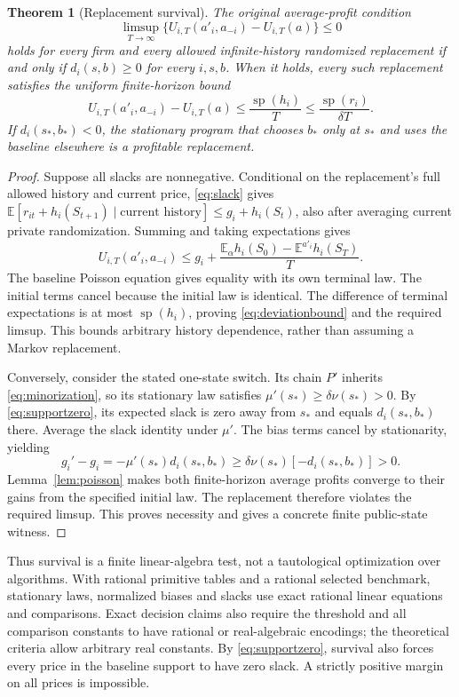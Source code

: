 \documentclass[11pt,a4paper]{article}
\newtheorem{theorem}{Theorem}
\newcommand{\E}{\mathbb E}
\newcommand{\spn}{\operatorname{sp}}
\begin{document}
\begin{theorem}[Replacement survival]\label{thm:replacement}
The original average-profit condition
\[
 \limsup_{T\to\infty}
 \{U_{i,T}(a'_i,a_{-i})-U_{i,T}(a)\}\leq0
\]
holds for every firm and every allowed infinite-history randomized replacement
if and only if $d_i(s,b)\geq0$ for every $i,s,b$.
When it holds, every such replacement satisfies the uniform finite-horizon bound
\begin{equation}\label{eq:deviationbound}
 U_{i,T}(a'_i,a_{-i})-U_{i,T}(a)
 \leq\frac{\spn(h_i)}T\leq\frac{\spn(r_i)}{\delta T}.
\end{equation}
If $d_i(s_*,b_*)<0$, the stationary program that chooses $b_*$ only at $s_*$
and uses the baseline elsewhere is a profitable replacement.
\end{theorem}
\begin{proof}
Suppose all slacks are nonnegative. Conditional on the replacement's full
allowed history and current price, \eqref{eq:slack} gives
$\E[r_{it}+h_i(S_{t+1})\mid\text{current history}]
\leq g_i+h_i(S_t)$, also after averaging current private randomization.
Summing and taking expectations gives
\[
 U_{i,T}(a'_i,a_{-i})\leq g_i+
 \frac{\E_\alpha h_i(S_0)-\E^{a'_i}h_i(S_T)}T.
\]
The baseline Poisson equation gives equality with its own terminal law.
The initial terms cancel because the initial law is identical. The difference
of terminal expectations is at most $\spn(h_i)$, proving
\eqref{eq:deviationbound} and the required limsup. This bounds arbitrary
history dependence, rather than assuming a Markov replacement.

Conversely, consider the stated one-state switch. Its chain $P'$ inherits
\eqref{eq:minorization}, so its stationary law satisfies
$\mu'(s_*)\geq\delta\nu(s_*)>0$. By \eqref{eq:supportzero}, its expected
slack is zero away from $s_*$ and equals $d_i(s_*,b_*)$ there. Average the
slack identity under $\mu'$. The bias terms cancel by stationarity, yielding
\[
 g_i'-g_i=-\mu'(s_*)d_i(s_*,b_*)
 \geq\delta\nu(s_*)[-d_i(s_*,b_*)]>0.
\]
Lemma~\ref{lem:poisson} makes both finite-horizon average profits converge
to their gains from the specified initial law. The replacement therefore
violates the required limsup. This proves necessity and gives a concrete
finite public-state witness.
\end{proof}

Thus survival is a finite linear-algebra test, not a tautological optimization
over algorithms. With rational primitive tables and a rational selected
benchmark, stationary laws, normalized biases and slacks use exact rational
linear equations and comparisons. Exact decision claims also require the
threshold and all comparison constants to have rational or real-algebraic
encodings; the theoretical criteria allow arbitrary real constants.
By \eqref{eq:supportzero}, survival also
forces every price in the baseline support to have zero slack. A strictly
positive margin on all prices is impossible.
\end{document}
